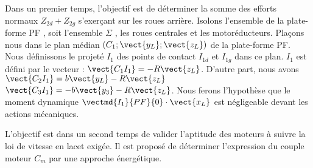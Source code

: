 
Dans un premier temps, l’objectif est de déterminer la somme des efforts normaux $Z_{2d}+Z_{2g}$ s’exerçant sur les roues
arrière. Isolons l’ensemble de la plate-forme PF , soit l’ensemble $\Sigma$ , les roues centrales et les motoréducteurs.
Plaçons nous dans le plan médian $\left(C_1;\vect{y_L};\vect{z_L}\right)$ de la plate-forme PF. Nous définissons le projeté $I_1$ des points de contact $I_{1d}$ et $I_{1g}$ dans ce plan. $I_1$ est défini par le vecteur : $\vect{C_1I_1}=-R\vect{z_L}$. 
D’autre part, nous avons 
$\vect{C_2I_1} = b\vect{y_L}-R\vect{z_L}$
$\vect{C_3I_1} = -b\vect{y_3}-R\vect{z_L}$.
Nous ferons l’hypothèse que le moment dynamique $\vectmd{I_1}{PF}{0}\cdot \vect{x_L}$
est négligeable devant les actions mécaniques.


L’objectif est dans un second temps de valider l’aptitude des moteurs à suivre la loi de vitesse en lacet exigée. Il est
proposé de déterminer l’expression du couple moteur $C_m$ par une approche énergétique.